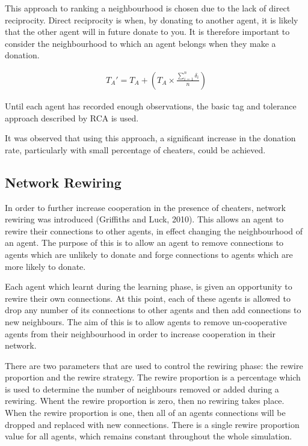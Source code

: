 This approach to ranking a neighbourhood is chosen
due to the lack of direct reciprocity.
Direct reciprocity is when, by donating to another agent, it is likely that the other agent will in future donate to you.
It is therefore important to consider the neighbourhood to which an agent belongs when they make a donation.

\begin{align*}
    T_A' = T_A + \left(T_A \times \frac{\sum_{i = 1}^{n}\delta_i}{n}\right)
\end{align*}

Until each agent has recorded enough observations,
the basic tag and tolerance approach described by RCA is used.

It was observed that using this approach,
a significant increase in the donation rate, particularly
with small percentage of cheaters, could be achieved.

\subsection{Network Rewiring}

In order to further increase cooperation
in the presence of cheaters, network rewiring was introduced (Griffiths and Luck, 2010).
This allows an agent to rewire their connections to other agents,
in effect changing the neighbourhood of an agent.
The purpose of this is to allow an agent to remove connections
to agents which are unlikely to donate and forge connections to agents
which are more likely to donate.

Each agent which learnt during the learning phase,
is given an opportunity to rewire their own connections.
At this point, each of these agents is allowed to drop any number of its
connections to other agents and then add connections to new neighbours.
The aim of this is to allow agents to remove un-cooperative agents from
their neighbourhood in order to increase cooperation in their network.

There are two parameters that are used to control the rewiring phase:
the rewire proportion and the rewire strategy.
The rewire proportion is a percentage which is used to determine the number of
neighbours removed or added during a rewiring.
Whent the rewire proportion is zero, then no rewiring takes place.
When the rewire proportion is one, then all of an agents connections will be dropped and replaced with new connections.
There is a single rewire proportion value for all agents, which remains constant throughout the whole simulation.

